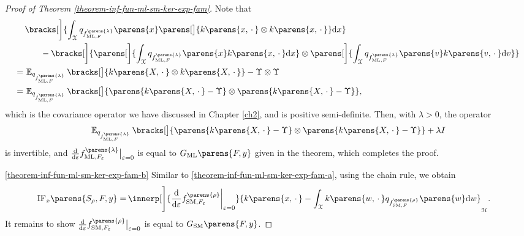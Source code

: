 \begin{proof}[Proof of Theorem \ref{theorem-inf-fun-ml-sm-ker-exp-fam}]
	Note that 
	\begin{align*}
		& \, \bracks[\bigg]{\int_{\calX} q_{f_{\ML, F}^{\parens{\lambda}}} \parens{x} \parens[\big]{k \parens{x, \,\cdot\,} \otimes k \parens{x, \,\cdot\,}} \diff x} \\ 
		& \qquad - \bracks[\bigg]{\parens[\bigg]{\int_{\calX} q_{f_{\ML, F}^{\parens{\lambda}}} \parens{x} k \parens{x, \,\cdot\,} \diff x} \otimes \parens[\bigg]{\int_{\calX} q_{f_{\ML, F}^{\parens{\lambda}}} \parens{v} k \parens{v, \,\cdot\,} \diff v}} \\ 
		= & \, \E_{q_{f_{\ML, F}^{\parens{\lambda}}}} \bracks[\big]{k \parens{X, \,\cdot\,} \otimes k \parens{X, \,\cdot\,}} - \Upsilon \otimes \Upsilon \nonumber \\ 
		= & \, \E_{q_{f_{\ML, F}^{\parens{\lambda}}}} \bracks[\big]{ \parens{k \parens{X, \,\cdot\,} - \Upsilon} \otimes \parens{k \parens{X, \,\cdot\,} - \Upsilon}}, 
	\end{align*}
	which is the covariance operator we have discussed in Chapter \ref{ch2}, and is positive semi-definite. Then, with $\lambda > 0$, the operator 
	\begin{align*}
		\E_{q_{f_{\ML, F}^{\parens{\lambda}}}} \bracks[\big]{ \parens{k \parens{X, \,\cdot\,} - \Upsilon} \otimes \parens{k \parens{X, \,\cdot\,} - \Upsilon}} + \lambda I 
	\end{align*}
	is invertible, and $\frac{\diff}{\diff \varepsilon} f_{\ML, F_{\varepsilon}}^{\parens{\lambda}} \big\vert_{\varepsilon = 0}$ is equal to $G_{\ML} \parens{F, y}$ given in the theorem, which completes the proof. 
	
	\ref{theorem-inf-fun-ml-sm-ker-exp-fam-b} Similar to \ref{theorem-inf-fun-ml-sm-ker-exp-fam-a}, using the chain rule, we obtain 
	\begin{align*}
		\mathrm{IF}_x \parens{S_{\rho}, F, y} = & \, \innerp[\Bigg]{ \frac{\diff}{\diff \varepsilon} f_{\SM, F_{\varepsilon}}^{\parens{\rho}} \bigg\vert_{\varepsilon = 0}}{ k \parens{x, \,\cdot\,} - \int_{\calX} k \parens{w, \,\cdot\,} q_{f_{\SM, F}^{\parens{\rho}}} \parens{w} \diff w }_{\calH}. 
	\end{align*}
	It remains to show $\frac{\diff}{\diff \varepsilon} f_{\SM, F_{\varepsilon}}^{\parens{\rho}} \big\vert_{\varepsilon = 0}$ is equal to $G_{\SM} \parens{F, y}$. 
	

\end{proof}
